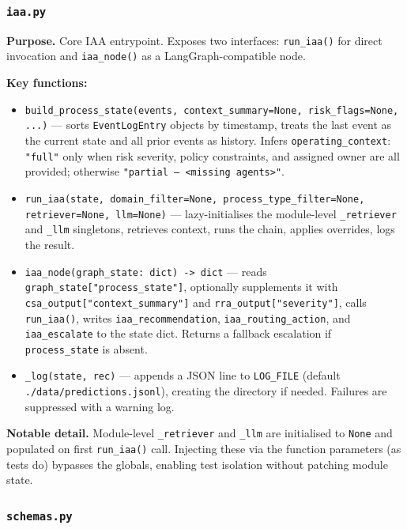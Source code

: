 \documentclass[12pt,a4paper]{article}
\begin{document}
\subsubsection{\texttt{iaa.py}}

\textbf{Purpose.} Core IAA entrypoint. Exposes two interfaces:
\texttt{run\_iaa()} for direct invocation and \texttt{iaa\_node()} as a
LangGraph-compatible node.

\textbf{Key functions:}
\begin{itemize}[nosep]
  \item \texttt{build\_process\_state(events, context\_summary=None, risk\_flags=None, ...)} ---
    sorts \texttt{EventLogEntry} objects by timestamp, treats the last event as the
    current state and all prior events as history. Infers \texttt{operating\_context}:
    \texttt{"full"} only when risk severity, policy constraints, and assigned owner are
    all provided; otherwise \texttt{"partial --- <missing agents>"}.
  \item \texttt{run\_iaa(state, domain\_filter=None, process\_type\_filter=None, retriever=None, llm=None)} ---
    lazy-initialises the module-level \texttt{\_retriever} and \texttt{\_llm} singletons,
    retrieves context, runs the chain, applies overrides, logs the result.
  \item \texttt{iaa\_node(graph\_state: dict) -> dict} --- reads
    \texttt{graph\_state["process\_state"]}, optionally supplements it with
    \texttt{csa\_output["context\_summary"]} and \texttt{rra\_output["severity"]},
    calls \texttt{run\_iaa()}, writes \texttt{iaa\_recommendation},
    \texttt{iaa\_routing\_action}, and \texttt{iaa\_escalate} to the state dict.
    Returns a fallback escalation if \texttt{process\_state} is absent.
  \item \texttt{\_log(state, rec)} --- appends a JSON line to \texttt{LOG\_FILE}
    (default \texttt{./data/predictions.jsonl}), creating the directory if needed.
    Failures are suppressed with a warning log.
\end{itemize}

\textbf{Notable detail.} Module-level \texttt{\_retriever} and \texttt{\_llm} are
initialised to \texttt{None} and populated on first \texttt{run\_iaa()} call.
Injecting these via the function parameters (as tests do) bypasses the globals,
enabling test isolation without patching module state.

\subsubsection{\texttt{schemas.py}}
\end{document}
